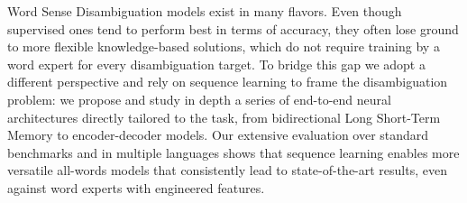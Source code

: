 Word Sense Disambiguation models exist in many flavors. Even though supervised ones tend to perform best in terms of accuracy, they often lose ground to more flexible knowledge-based solutions, which do not require training by a word expert for every disambiguation target. To bridge this gap we adopt a different perspective and rely on sequence learning to frame the disambiguation problem: we propose and study in depth a series of end-to-end neural architectures directly tailored to the task, from bidirectional Long Short-Term Memory to encoder-decoder models. Our extensive evaluation over standard benchmarks and in multiple languages shows that sequence learning enables more versatile all-words models that consistently lead to state-of-the-art results, even against word experts with engineered features.
